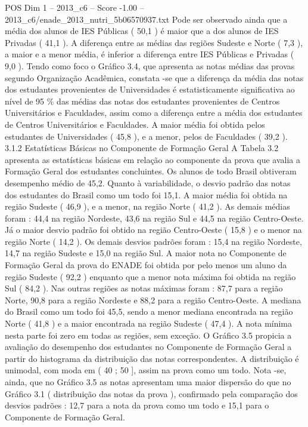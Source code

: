 \begin{textsample}{POS Dim 1 – 2013\_c6 – Score -1.00 – 2013\_c6/enade\_2013\_nutri\_5b06570937.txt}
Pode ser observado ainda que a média dos alunos de IES Públicas ( 50,1 ) é maior que a dos alunos de IES Privadas ( 41,1 ).
A diferença entre as médias das regiões Sudeste e Norte ( 7,3 ), a maior e a menor média, é inferior a diferença entre IES Públicas e Privadas ( 9,0 ).
Tendo como foco o Gráfico 3.4, que apresenta as notas médias das provas segundo Organização Acadêmica, constata -se que a diferença da média das notas dos estudantes provenientes de Universidades é estatisticamente significativa ao nível de 95 \% das médias das notas dos estudantes provenientes de Centros Universitários e Faculdades, assim como a diferença entre a média dos estudantes de Centros Universitários e Faculdades.
A maior média foi obtida pelos estudantes de Universidades ( 45,8 ), e a menor, pelos de Faculdades ( 39,2 ). 3.1.2 Estatísticas Básicas no Componente de Formação Geral A Tabela 3.2 apresenta as estatísticas básicas em relação ao componente da prova que avalia a Formação Geral dos estudantes concluintes.
Os alunos de todo Brasil obtiveram desempenho médio de 45,2.
Quanto à variabilidade, o desvio padrão das notas dos estudantes do Brasil como um todo foi 15,1.
A maior média foi obtida na região Sudeste ( 46,9 ), e a menor, na região Norte ( 41,2 ).
As demais médias foram : 44,4 na região Nordeste, 43,6 na região Sul e 44,5 na região Centro-Oeste.
Já o maior desvio padrão foi obtido na região Centro-Oeste ( 15,8 ) e o menor na região Norte ( 14,2 ).
Os demais desvios padrões foram : 15,4 na região Nordeste, 14,7 na região Sudeste e 15,0 na região Sul.
A maior nota no Componente de Formação Geral da prova do ENADE foi obtida por pelo menos um aluno da região Sudeste ( 92,2 ) enquanto que a menor nota máxima foi obtida na região Sul ( 84,2 ).
Nas outras regiões as notas máximas foram : 87,7 para a região Norte, 90,8 para a região Nordeste e 88,2 para a região Centro-Oeste.
A mediana do Brasil como um todo foi 45,5, sendo a menor mediana encontrada na região Norte ( 41,8 ) e a maior encontrada na região Sudeste ( 47,4 ).
A nota mínima nesta parte foi zero em todas as regiões, sem exceção.
O Gráfico 3.5 propicia a avaliação do desempenho dos estudantes no Componente de Formação Geral a partir do histograma da distribuição das notas correspondentes.
A distribuição é unimodal, com moda em ( 40 ; 50 ], assim na prova como um todo.
Nota -se, ainda, que no Gráfico 3.5 as notas apresentam uma maior dispersão do que no Gráfico 3.1 ( distribuição das notas da prova ), confirmado pela comparação dos desvios padrões : 12,7 para a nota da prova como um todo e 15,1 para o Componente de Formação Geral.

\end{textsample}
